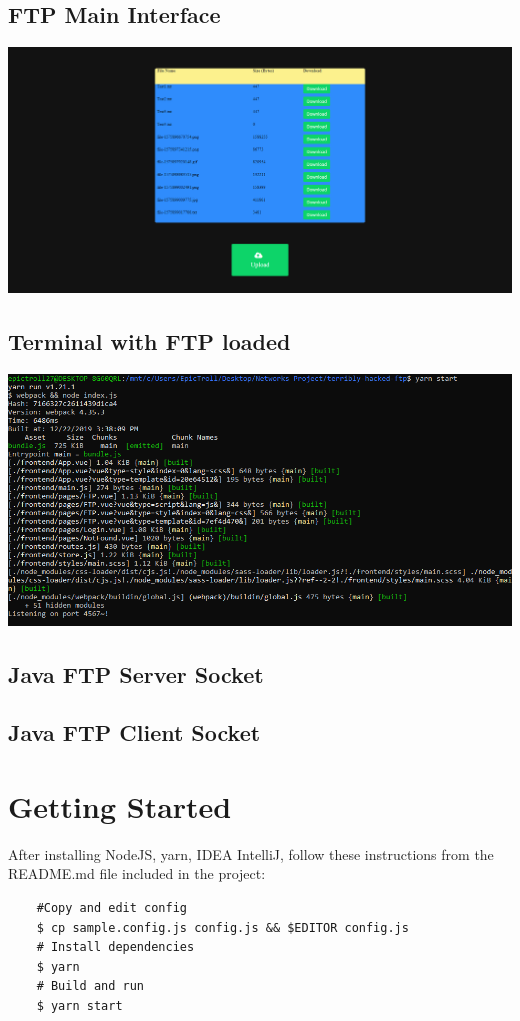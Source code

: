 \documentclass[12pt]{article}
\begin{document}
\subsection{FTP Main Interface}
\includegraphics[scale=0.3]{images/dirlist.png}
\subsection{Terminal with FTP loaded}
\includegraphics[scale=0.6]{images/bash.png}
\subsection{Java FTP Server Socket}
\subsection{Java FTP Client Socket}

\section{Getting Started}
After installing NodeJS, yarn, IDEA IntelliJ, follow these instructions from the README.md file included in the project:
\begin{verbatim}
	#Copy and edit config
	$ cp sample.config.js config.js && $EDITOR config.js
	# Install dependencies
	$ yarn
	# Build and run
	$ yarn start
\end{verbatim}
\end{document}
